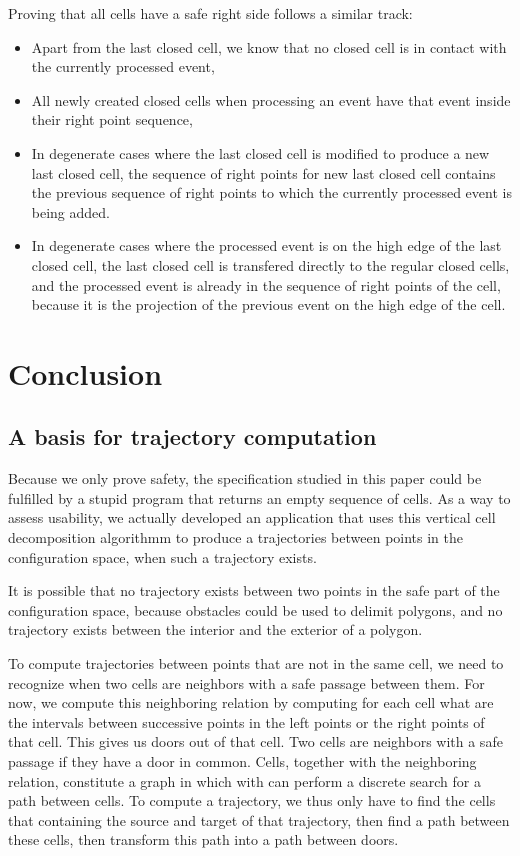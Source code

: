 \documentclass[a4paper, USenglish, cleveref, autoref, thm-restate]{lipics-v2021}
\begin{document}
Proving that all cells have a safe right side follows a similar track:
\begin{itemize}
\item Apart from the last closed cell, we know that no closed cell is
  in contact with the currently processed event,
\item All newly created closed cells when processing an event have
  that event inside their right point sequence,
\item In degenerate cases where the last closed cell is modified to
  produce a new last closed cell, the sequence of right points for new
  last closed cell contains the previous sequence of right points to
  which the currently processed event is being added.
\item In degenerate cases where the processed event is on the high
  edge of the last closed cell, the last closed cell is transfered
  directly to the regular closed cells, and the processed event is
  already in the sequence of right points of the cell, because it is
  the projection of the previous event on the high edge of the cell.
\end{itemize}
\section{Conclusion}
\subsection{A basis for trajectory computation}
Because we only prove safety, the specification studied in this paper
could be fulfilled by a stupid program that returns an empty sequence
of cells.  As a way to assess usability, we actually developed an
application that uses this vertical cell decomposition algorithmm to
produce a trajectories between points in the configuration space, when
such a trajectory exists.

It is possible that no trajectory exists between two points in the
safe part of the configuration space, because obstacles could be used
to delimit polygons, and no trajectory exists between the interior and
the exterior of a polygon.  

To compute trajectories between points that are not in the same cell,
we need to recognize when two cells are neighbors with a safe passage
between them.  For now, we compute this neighboring relation by
computing for each cell what are the intervals between successive
points in the left points or the right points of that cell.  This
gives us doors out of that cell.  Two cells are neighbors with a safe
passage if they have a door in common.  Cells, together with the
neighboring relation, constitute a graph in which with can perform a
discrete search for a path between cells.  
To compute a trajectory, we
thus only have to find the cells that containing the source and target
of that trajectory, then find a path between these cells, then
transform this path into a path between doors.
\end{document}
